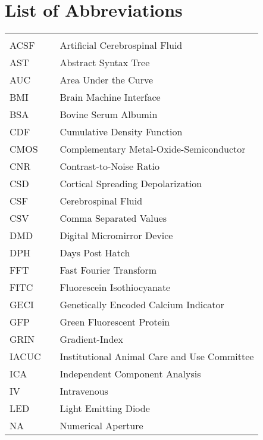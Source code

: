 \chapter*{List of Abbreviations}
\begin{center}
  \begin{tabular}{lll}
    \hspace*{2em} & \hspace*{1in} & \hspace*{4.5in} \\
    ACSF & \dotfill & Artificial Cerebrospinal Fluid \\
    AST  & \dotfill & Abstract Syntax Tree \\
    AUC  & \dotfill & Area Under the Curve \\
    BMI  & \dotfill & Brain Machine Interface \\
    BSA  & \dotfill & Bovine Serum Albumin \\
    CDF  & \dotfill & Cumulative Density Function \\
    CMOS & \dotfill & Complementary Metal-Oxide-Semiconductor \\
    CNR  & \dotfill & Contrast-to-Noise Ratio \\
    CSD  & \dotfill & Cortical Spreading Depolarization \\
    CSF  & \dotfill & Cerebrospinal Fluid \\
    CSV  & \dotfill & Comma Separated Values \\
    DMD  & \dotfill & Digital Micromirror Device \\
    DPH  & \dotfill & Days Post Hatch \\
    FFT  & \dotfill & Fast Fourier Transform \\
    FITC & \dotfill & Fluorescein Isothiocyanate \\
    GECI & \dotfill & Genetically Encoded Calcium Indicator \\
    GFP  & \dotfill & Green Fluorescent Protein \\
    GRIN & \dotfill & Gradient-Index \\
    IACUC& \dotfill & Institutional Animal Care and Use Committee \\
    ICA  & \dotfill & Independent Component Analysis \\
    IV   & \dotfill & Intravenous \\
    LED  & \dotfill & Light Emitting Diode \\
    NA   & \dotfill & Numerical Aperture \\

\end{tabular}
\end{center}
